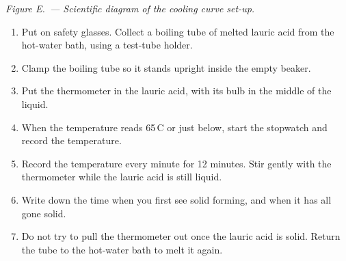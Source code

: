 \documentclass[11pt,a4paper]{article}
\newcounter{fignum}[section]
\newcounter{expfignum}[section]
\renewcommand{\theexpfignum}{E\thesection.\arabic{expfignum}}
\newcommand{\expfigcap}[1]{%
  \begin{center}
    \refstepcounter{expfignum}\label{fig:\theexpfignum}%
    \small\itshape\color{DarkGrey} Figure \theexpfignum\ --- #1
  \end{center}%
}
\newcommand{\eqStand}{%
  \draw[eq] (0,0) rectangle (2.3,0.2);
  \draw[eq] (0.35,0.2) -- (0.35,4.0) (0.5,0.2) -- (0.5,4.0);
  \draw[eq] (0.25,2.75) rectangle (0.75,3.2);
  \draw[eq] (0.75,2.92) -- (1.6,2.92) (0.75,3.03) -- (1.6,3.03);
  \draw[eq] (1.6,2.7) -- (1.6,3.25) (1.6,2.7) -- (1.95,2.7) (1.6,3.25) -- (1.95,3.25);}
\newcommand{\eqlab}[3]{\draw[eqlab] #1 -- #2 node[eqtext, anchor=west] {#3};}
\newcommand{\eqlabl}[3]{\draw[eqlab] #1 -- #2 node[eqtext, anchor=east] {#3};}
\begin{document}
\begin{center}
\expfigcap{Scientific diagram of the cooling curve set-up.}
\end{center}

\begin{enumerate}[itemsep=2pt]
  \item Put on safety glasses. Collect a boiling tube of melted lauric acid from the hot-water bath, using a test-tube holder.
  \item Clamp the boiling tube so it stands upright inside the empty beaker.
  \item Put the thermometer in the lauric acid, with its bulb in the middle of the liquid.
  \item When the temperature reads 65\,\textdegree C or just below, start the stopwatch and record the temperature.
  \item Record the temperature every minute for 12 minutes. Stir gently with the thermometer while the lauric acid is still liquid.
  \item Write down the time when you first see solid forming, and when it has all gone solid.
  \item Do not try to pull the thermometer out once the lauric acid is solid. Return the tube to the hot-water bath to melt it again.
\end{enumerate}

\end{document}
